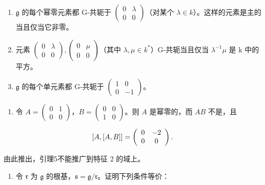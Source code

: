 \begin{enumerate}
\def\labelenumi{\alph{enumi})}
\item
  \(\mathfrak{g}\) 的每个幂零元素都 G-共轭于 \(\left( \begin{array}{cc}0 & \lambda \\ 0 & 0 \end{array} \right)\)（对某个 \(\lambda \in k\)）。这样的元素是主的当且仅当它非零。
\item
  元素 \(\begin{pmatrix}0&\lambda\\0&0\end{pmatrix},\begin{pmatrix}0&\mu\\0&0\end{pmatrix}\)（其中 \(\lambda,\mu\in k^{*}\)）G-共轭当且仅当 \(\lambda^{-1}\mu\) 是 k 中的平方。
\item
  \(\mathfrak{g}\) 的每个单元素都 G-共轭于 \(\left( \begin{array}{cc}1 & 0\\ 0 & -1 \end{array} \right)\)。
\end{enumerate}

\begin{enumerate}
\def\labelenumi{\arabic{enumi})}
\setcounter{enumi}{1}
\tightlist
\item
  令 \(A = \begin{pmatrix} 0 & 1 \\ 0 & 0 \end{pmatrix}\)，\(B = \begin{pmatrix} 0 & 0 \\ 1 & 0 \end{pmatrix}\)。则 \(A\) 是幂零的，而 \(AB\) 不是，且
\end{enumerate}

\[
[ A, [ A, B ] ] = \left( \begin{array}{c c} 0 & - 2 \\ 0 & 0 \end{array} \right).
\]

由此推出，引理5不能推广到特征 2 的域上。

\begin{enumerate}
\def\labelenumi{\arabic{enumi})}
\setcounter{enumi}{2}
\tightlist
\item
  令 \(\mathfrak{r}\) 为 \(\mathfrak{g}\) 的根基，\(\mathfrak{s} = \mathfrak{g} / \mathfrak{r}\)。证明下列条件等价：
\end{enumerate}

